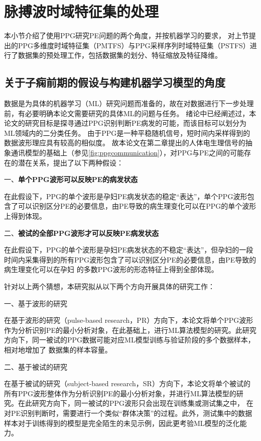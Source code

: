 \section{脉搏波时域特征集的处理}
本小节介绍了使用PPG研究PE问题的两个角度，并按机器学习的要求，
对上节提出的PPG多维度时域特征集（PMTFS）与PPG采样序列时域特征集（PSTFS）进行了数据集的预处理工作，包括数据集的划分、特征缩放及特征降维。

\subsection{关于子痫前期的假设与构建机器学习模型的角度}
数据是为具体的机器学习（ML）研究问题而准备的，故在对数据进行下一步处理前，有必要明确本论文需要研究的具体ML的问题与任务。
绪论中已经阐述过，本论文的研究目标是探寻通过PPG识别判断PE病发的可能，而该目标可以划分为ML领域内的二分类任务。
由于PPG是一种平稳随机信号，短时间内采样得到的数据波形理应具有较高的相似度\cite{Qiu2012,PPGYY,Ma2015}。
故本论文在第二章提出的人体电生理信号的抽象通讯模型的基础上（参见\autoref{fig:ppgcommunication}），对PPG与PE之间的可能存在的潜在关系，提出了以下两种假设：

一、\textbf{单个PPG波形可以反映PE的病发状态}

在此假设下，PPG的单个波形是孕妇PE病发状态的稳定“表达”，单个PPG波形包含了可以识别区分PE的必要信息，由PE导致的病生理变化可以在PPG的单个波形上得到体现。

二、\textbf{被试的全部PPG波形才可以反映PE病发状态}

在此假设下，PPG的单个波形是孕妇PE病发状态的不稳定“表达”，但孕妇的一段时间内采集得到的所有PPG波形包含了可以识别区分PE的必要信息，由PE导致的病生理变化可以在孕妇
的多数PPG波形的形态特征上得到全部体现。

针对以上两个猜想，本研究拟从以下两个方向开展具体的研究工作：

一、基于波形的研究

在基于波形的研究（pulse-based research，PR）方向下，本论文将单个PPG波形作为分析识别PE的最小分析对象，在此基础上，进行ML算法模型的研究。此研究方向下，同一被试的PPG数据可能对应ML模型训练与验证阶段的多个数据样本，相对地增加了
数据集的样本容量。

二、基于被试的研究

在基于被试的研究（subject-based research，SR）方向下，本论文将单个被试的所有PPG波形整体作为分析识别PE的最小分析对象，并进行ML算法模型的研究。在此研究方向下，同一被试的PPG波形只会出现在训练集或测试集之中，
在对PE识别判断时，需要进行一个类似“群体决策”的过程。此外，测试集中的数据样本对于训练得到的模型是完全陌生的未见示例，因此更考验ML模型的泛化能力。

